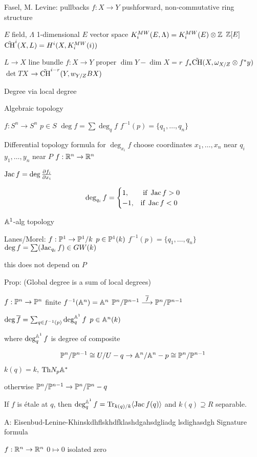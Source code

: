 Fasel, M. Levine: pullbacks $f: X \to Y$ pushforward, non-commutative ring structure

$E$ field, $\Lambda$ 1-dimensional $E$ vector space
$K_i^{MW}(E,\Lambda)= K_i^{MW}(E) \otimes \Z$ $\Z[E]$
$\tilde{\ch}^i(X,L)= H^i(X,K_i^{MW}(i))$


$L \to X$ line bundle
$f: X \to Y$ proper $\dim Y - \dim X=r$
$f_* \tilde{\ch}(X, \omega_{X/Z} \otimes f^* y)$
$\det TX$
$\to \tilde{\ch}^{i-r}(Y, w_{Y/Z} BX)$


Degree via local degree

Algebraic topology

$f: S^n \to S^n$ 
$p \in S$
$\deg f= \sum \deg_q f$
$f^{-1}(p)= \{q_1,\ldots,q_n\}$

Differential topology formula for $\deg_{x_i} f$
choose coordinates $x_1,\ldots,x_n$ near $q_i$
$y_1,\ldots,y_n$ near $P$
$f: \R^n \to \R^n$

$\jac f= \deg \frac{\partial f_i}{\partial x_i}$

	\[
	\deg_{q_i} f=
	\begin{cases}
	1, & \text{ if } \jac f >0 \\
	-1, & \text{if }\jac f<0
	\end{cases}
	\]



$\A^1$-alg topology

Lanes/Morel: $f: \P^1 \to \P^1/k$
$p \in \P^1(k)$
$f^{-1}(p)=\{q_1,\ldots,q_n\}$
$\deg f= \sum (\jac_{q_i} f) \in GW(k)$

this does not depend on $P$


Prop: (Global degree is a sum of local degrees)

$f: \P^n \to \P^n$ finite $f^{-1}(\A^n) = \A^n$
$\P^n/\P^{n-1} \ma{\overline{f}} \P^n/\P^{n-1}$


$\deg \overline{f}= \sum_{q \in f^{-1}(p)} \deg_q^{\A^1} f$
$p \in \A^n(k)$

where $\deg_q^{\A^1} f$ is degree of composite

	\[
	\P^n/\P^{n-1} \cong U/U-q \to \A^n /\A^n-p \cong \P^n/\P^{n-1}
	\]
$k(q)=k$, $\th N_p \A^*$

otherwise $\P^n/\P^{n-1} \to \P^n/\P^n - q$

If $f$ is \'etale at $q$, then $\deg_q^{\A^1} f = \tr_{k(q)/k} \langle \jac f(q) \rangle$
and $k(q) \supseteq R$ separable. 


A: Eisenbud-Lenine-Khinskdhflskhdfklashdgahsdgliadg lsdighasdgh Signature formula

$f: \R^n \to \R^n$
$0 \mapsto 0$ isolated zero


